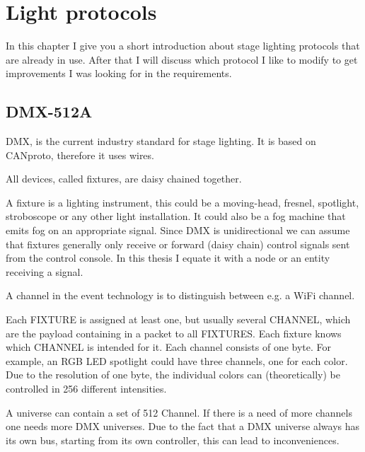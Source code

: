 \documentclass[]{ccs-thesis}
\begin{document}
\section{Light protocols}

In this chapter I give you a short introduction about stage lighting protocols that are already in use. 
After that I will discuss which protocol I like to modify to get improvements I was looking for in the requirements.

\subsection*{DMX-512A}
\ac{DMX}, is the current industry standard for stage lighting. It is based on \ac{CANproto}, therefore it uses wires.

All devices, called fixtures, are daisy chained together.

A fixture is a lighting instrument, 
this could be a moving-head, fresnel, spotlight, stroboscope or any other light installation.
It could also be a fog machine that emits fog on an appropriate signal.
Since \ac{DMX} is unidirectional we  can assume that fixtures generally only receive or forward (daisy chain) control signals sent from the control console.
In this thesis I equate it with a node or an entity receiving a signal.

A channel in the event technology is to distinguish between e.g. a WiFi channel. 

Each FIXTURE is assigned at least one, but usually several CHANNEL, which are the payload containing in a packet to all FIXTURES. 
Each fixture knows which CHANNEL is intended for it. Each channel consists of one byte.
For example, an RGB LED spotlight could have three channels, one for each color.
Due to the resolution of one byte, the individual colors can (theoretically) be controlled in 256 different intensities.

A universe can contain a set of 512 Channel. If there is a need of more channels one needs more DMX universes.
Due to the fact that a DMX universe always has its own bus, starting from its own controller, this can lead to inconveniences.
\end{document}
